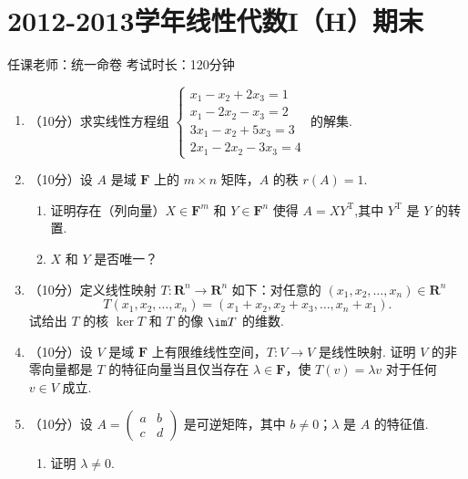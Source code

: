 \section{2012-2013学年线性代数I（H）期末}

\begin{center}
    任课老师：统一命卷\hspace{4em} 考试时长：120分钟
\end{center}

\begin{enumerate}
    \item （10分）求实线性方程组 $\begin{cases}x_1-x_2+2x_3 = 1 \\ x_1-2x_2-x_3=2 \\ 3x_1-x_2+5x_3=3 \\ 2x_1-2x_2-3x_3 = 4\end{cases}$ 的解集.

    \item （10分）设 $A$ 是域 $\mathbf{F}$ 上的 $m\times n$ 矩阵，$A$ 的秩 $r(A)=1$.
    \begin{enumerate}
        \item 证明存在（列向量）$X\in \mathbf{F}^m$ 和 $Y\in \mathbf{F}^n$ 使得 $A=XY^\mathrm{T}$,其中 $Y^\mathrm{T}$ 是 $Y$ 的转置.

        \item $X$ 和 $Y$ 是否唯一？
    \end{enumerate}

    \item （10分）定义线性映射 $T\colon \mathbf{R}^n \to \mathbf{R}^n$ 如下：对任意的 $(x_1,x_2,\ldots,x_n) \in \mathbf{R}^n$
    \[T(x_1,x_2,\ldots,x_n)=(x_1+x_2,x_2+x_3,\ldots,x_n+x_1).\]
    试给出 $T$ 的核 $\ker T$ 和 $T$ 的像 $\im T$ 的维数.

    \item （10分）设 $V$ 是域 $\mathbf{F}$ 上有限维线性空间，$T\colon V\to V$ 是线性映射. 证明 $V$ 的非零向量都是 $T$ 的特征向量当且仅当存在 $\lambda \in \mathbf{F}$，使 $T(v)=\lambda v$ 对于任何 $v \in V$ 成立.

    \item （10分）设 $A=\begin{pmatrix}a & b \\ c & d\end{pmatrix}$ 是可逆矩阵，其中 $b\neq 0$；$\lambda$ 是 $A$ 的特征值.
    \begin{enumerate}
        \item 证明 $\lambda \neq 0$.


\end{enumerate}
\end{enumerate}
